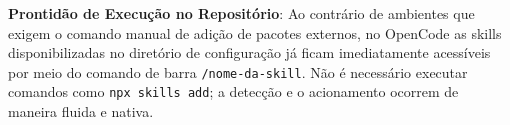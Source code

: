\begin{dicaopencode}
\textbf{Prontid{\~a}o de Execu{\c c}{\~a}o no Reposit{\'o}rio}: Ao contr{\'a}rio de ambientes que exigem o comando manual de adi{\c c}{\~a}o de pacotes externos, no OpenCode as skills disponibilizadas no diret{\'o}rio de configura{\c c}{\~a}o j{\'a} ficam imediatamente acess{\'i}veis por meio do comando de barra \texttt{/nome-da-skill}. N{\~a}o {\'e} necess{\'a}rio executar comandos como \texttt{npx skills add}; a detec{\c c}{\~a}o e o acionamento ocorrem de maneira fluida e nativa.
\end{dicaopencode}

